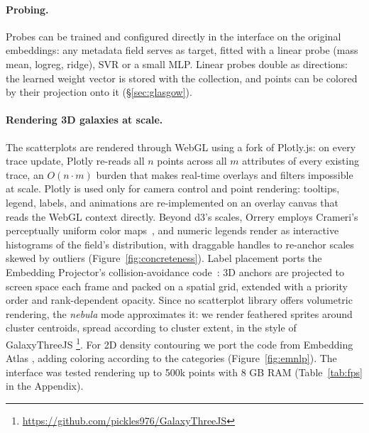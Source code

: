 \documentclass[11pt]{article}
\begin{document}


\paragraph{Probing.}
Probes can be trained and configured directly in the interface on the original embeddings: any metadata field serves as target, fitted with a linear probe (mass mean, logreg, ridge), SVR or a small MLP. Linear probes double as directions: the learned weight vector is stored with the collection, and points can be colored by their projection onto it (\S\ref{sec:glasgow}).



\paragraph{Rendering 3D galaxies at scale.}


The scatterplots are rendered through WebGL using a fork of Plotly.js: on every trace update, Plotly re-reads all $n$ points across all $m$ attributes of every existing trace, an $O(n \cdot m)$ burden that makes real-time overlays and filters impossible at scale. Plotly is used only for camera control and point rendering: tooltips, legend, labels, and animations are re-implemented on an overlay canvas that reads the WebGL context directly. Beyond d3's scales, Orrery employs Crameri's perceptually uniform color maps~\cite{crameri2018scientific, crameri2020misuse}, and numeric legends render as interactive histograms of the field's distribution, with draggable handles to re-anchor scales skewed by outliers (Figure~\ref{fig:concreteness}).  Label placement ports the Embedding Projector's collision-avoidance code~\cite{smilkov2016embeddingprojectorinteractivevisualization}: 3D anchors are projected to screen space each frame and packed on a spatial grid, extended with a priority order and rank-dependent opacity. Since no scatterplot library offers volumetric rendering, the \emph{nebula} mode approximates it: we render feathered sprites around cluster centroids, spread according to cluster extent, in the style of GalaxyThreeJS \footnote{\url{https://github.com/pickles976/GalaxyThreeJS}}. 
For 2D density contouring we port the code from Embedding Atlas \cite{ren2025embeddingatlaslowfrictioninteractive}, adding coloring according to the categories (Figure~\ref{fig:emnlp}). The interface was tested rendering up to 500k points with 8 GB RAM (Table~\ref{tab:fps} in the Appendix).
\end{document}

